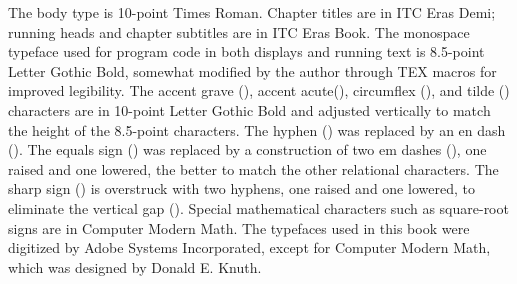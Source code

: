 The body type is 10-point Times Roman. Chapter titles are in ITC Eras Demi;
running heads and chapter subtitles are in ITC Eras Book.  The monospace typeface used for program
code in both displays and running text is 8.5-point Letter Gothic Bold, somewhat
modified by the author through TEX macros for improved legibility. The accent
grave (\cd{\Xbq}), accent acute(\cd{\Xquote}),
circumflex (\cd{\Xcircumflex}), and tilde (\cd{\Xtilde})
characters are in 10-point Letter Gothic
Bold and adjusted vertically to match the height of the 8.5-point characters.  The
hyphen () was replaced by an en dash (\cd{-}).
The equals sign () was replaced by a construction of two em
dashes (\cd{=}), one raised and one lowered, the better to match the other
relational characters.  The sharp sign ()
is overstruck with two hyphens,
one raised and one lowered, to eliminate the vertical gap (\cd{\#}).  Special mathematical
characters such as square-root signs are in Computer Modern Math. The typefaces
used in this book were digitized by Adobe Systems Incorporated, except for
Computer Modern Math, which was designed by Donald E. Knuth.
